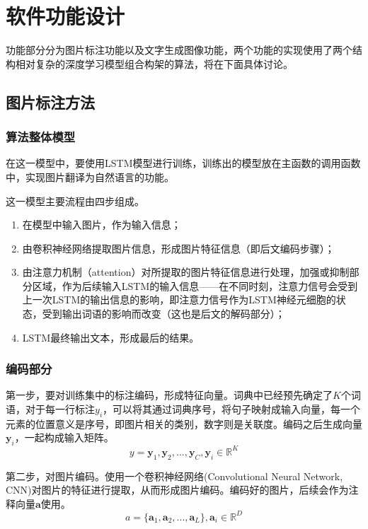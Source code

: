 
\chapter{软件功能设计}
功能部分分为图片标注功能以及文字生成图像功能，两个功能的实现使用了两个结构相对复杂的深度学习模型组合构架的算法，将在下面具体讨论。
 
\section{图片标注方法}
\subsection{算法整体模型}
在这一模型中，要使用LSTM模型进行训练，训练出的模型放在主函数的调用函数中，实现图片翻译为自然语言的功能。

这一模型主要流程由四步组成。

\begin{enumerate}[fullwidth,itemindent=2em,label=\arabic*.]
    \item 在模型中输入图片，作为输入信息；
    \item 由卷积神经网络提取图片信息，形成图片特征信息（即后文编码步骤）；
    \item 由注意力机制（attention）对所提取的图片特征信息进行处理，加强或抑制部分区域，作为后续输入LSTM的输入信息——在不同时刻，注意力信号会受到上一次LSTM的输出信息的影响，即注意力信号作为LSTM神经元细胞的状态，受到输出词语的影响而改变（这也是后文的解码部分）；
    \item LSTM最终输出文本，形成最后的结果。
\end{enumerate}

\subsection{编码部分}
第一步，要对训练集中的标注编码，形成特征向量。词典中已经预先确定了$K$个词语，对于每一行标注$y_i$，可以将其通过词典序号，将句子映射成输入向量，每一个元素的位置意义是序号，即图片相关的类别，数字则是关联度。编码之后生成向量$\textbf{y}_i$，一起构成输入矩阵。
$$y = {\textbf{y}_1, \textbf{y}_2, ..., \textbf{y}_C}, \textbf{y}_i\in \mathbb{R}^K$$

第二步，对图片编码。使用一个卷积神经网络(Convolutional Neural Network, CNN)对图片的特征进行提取，从而形成图片编码。编码好的图片，后续会作为注释向量$\textbf{a}$使用。
$$a = \{\textbf{a}_1, \textbf{a}_2, ... , \textbf{a}_L\}, \textbf{a}_i \in \mathbb{R}^D$$

